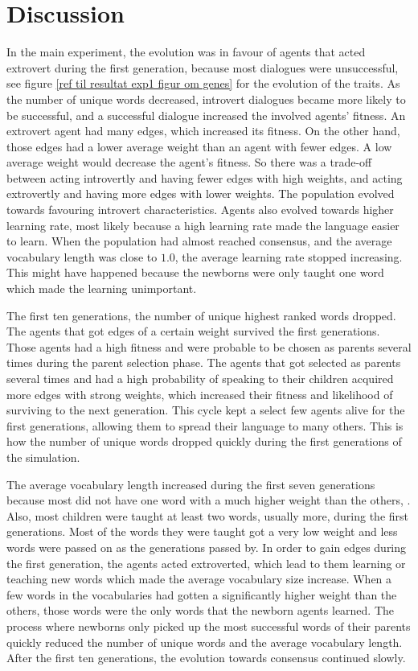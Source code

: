 \acresetall
\chapter{Discussion}
In the main experiment, the evolution was in favour of agents that acted extrovert during the first generation, because most dialogues were unsuccessful, see figure \ref{ref til resultat exp1 figur om genes} for the evolution of the traits. As the number of unique words decreased, introvert dialogues became more likely to be successful, and a successful dialogue increased the involved agents' fitness. An extrovert agent had many edges, which increased its fitness. On the other hand, those edges had a lower average weight than an agent with fewer edges. A low average weight would decrease the agent's fitness. So there was a trade-off between acting introvertly and having fewer edges with high weights, and acting extrovertly and having more edges with lower weights. The population evolved towards favouring introvert characteristics. Agents also evolved towards higher learning rate, most likely because a high learning rate made the language easier to learn. When the population had almost reached consensus, and the average vocabulary length was close to $1.0$, the average learning rate stopped increasing. This might have happened because the newborns were only taught one word which made the learning unimportant. 

The first ten generations, the number of unique highest ranked words dropped. The agents that got edges of a certain weight survived the first generations. Those agents had a high fitness and were probable to be chosen as parents several times during the parent selection phase. The agents that got selected as parents several times and had a high probability of speaking to their children acquired more edges with strong weights, which increased their fitness and likelihood of surviving to the next generation. This cycle kept a select few agents alive for the first generations, allowing them to spread their language to many others. This is how the number of unique words dropped quickly during the first generations of the simulation. 

The average vocabulary length increased during the first seven generations because most did not have one word with a much higher weight than the others, . Also, most children were taught at least two words, usually more, during the first generations. Most of the words they were taught got a very low weight and less words were passed on as the generations passed by. In order to gain edges during the first generation, the agents acted extroverted, which lead to them learning or teaching new words which made the average vocabulary size increase. When a few words in the vocabularies had gotten a significantly higher weight than the others, those words were the only words that the newborn agents learned. The process where newborns only picked up the most successful words of their parents quickly reduced the number of unique words and the average vocabulary length. After the first ten generations, the evolution towards consensus continued slowly. 
 
